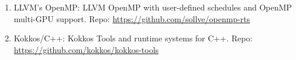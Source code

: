 \begin{enumerate}
	\item LLVM's OpenMP: LLVM OpenMP with user-defined schedules and OpenMP multi-GPU support. Repo: \url{https://github.com/sollve/openmp-rts}
	\item Kokkos/C++: Kokkos Tools and runtime systems for C++. Repo: \url{https://github.com/kokkos/kokkos-tools}
\end{enumerate}
